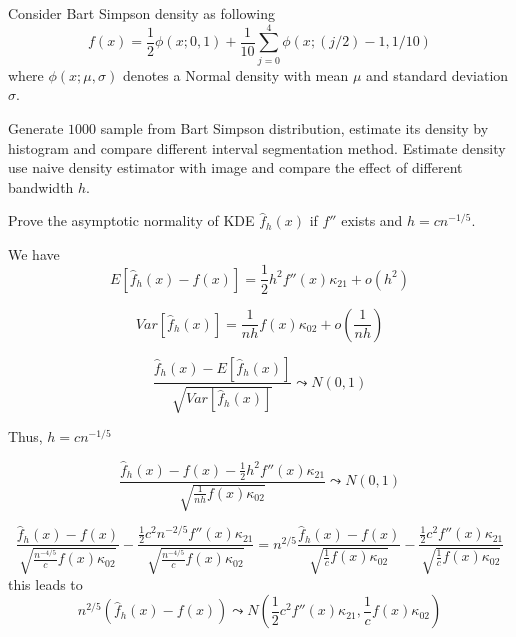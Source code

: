 \begin{problem}
    Consider Bart Simpson density as following
    \begin{equation*}
        f(x)=\frac{1}{2} \phi(x ; 0,1)+\frac{1}{10} \sum_{j=0}^{4} \phi(x ;(j / 2)-1,1 / 10)
    \end{equation*}
    where $\phi(x ;\mu, \sigma)$ denotes a Normal density with mean $\mu$ and standard deviation $\sigma$.

    Generate $1000$ sample from Bart Simpson distribution, estimate its density by histogram and compare different interval segmentation method. 
    Estimate density use naive density estimator with image and compare the effect of different bandwidth $h$.
\end{problem}

\begin{problem}
    Prove the asymptotic normality of KDE $\hat{f}_h(x)$ if $f''$ exists and $h=cn^{-1/5}$.
\end{problem}

\begin{solution}
    We have
    \begin{equation*}
        E[\hat{f}_h(x) - f(x)] = \frac{1}{2} h^2 f''(x) \kappa_{21} + o(h^2)
    \end{equation*}
    
    \begin{equation*}
        Var[ \hat{f}_h(x) ] = \frac{1}{nh} f(x) \kappa_{02} + o(\frac{1}{nh})
    \end{equation*}
    
    \begin{equation*}
        \frac{\hat{f}_h(x) - E[\hat{f}_h(x)]}{\sqrt{Var[\hat{f}_h(x)]}} \leadsto N(0,1)
    \end{equation*}
    
    Thus, $h=cn^{-1/5}$
    
    \begin{equation*}
        \frac{\hat{f}_h(x) - f(x) - \frac{1}{2} h^2 f''(x) \kappa_{21}}{\sqrt{\frac{1}{nh} f(x) \kappa_{02}}} \leadsto N(0,1)
    \end{equation*}
    
    \begin{equation*}
        \frac{\hat{f}_h(x) - f(x) } {\sqrt{\frac{n^{-4/5}}{c} f(x) \kappa_{02}}} - \frac{\frac{1}{2} c^2 n^{-2/5} f''(x) \kappa_{21}}{\sqrt{\frac{n^{-4/5}}{c} f(x) \kappa_{02}}}
        = n^{2/5} \frac{\hat{f}_h(x) - f(x) } {\sqrt{\frac{1}{c} f(x) \kappa_{02}}} - \frac{\frac{1}{2} c^2  f''(x) \kappa_{21}}{\sqrt{\frac{1}{c} f(x) \kappa_{02}}}
    \end{equation*}
    this leads to 
    \begin{equation*}
        n^{2/5} \left( \hat{f}_h(x) - f(x)  \right) \leadsto N \left(\frac{1}{2} c^2  f''(x) \kappa_{21}, \frac{1}{c} f(x) \kappa_{02} \right)
    \end{equation*}
\end{solution}


